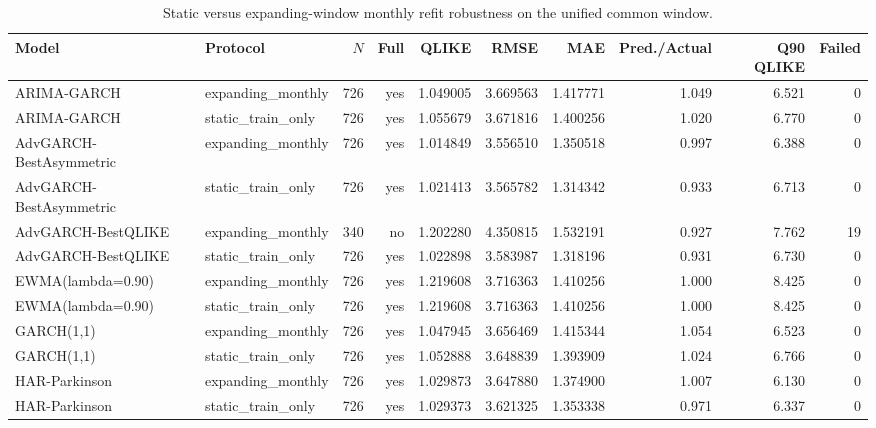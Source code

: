 \begin{table}[!t]
\centering
\caption{Static versus expanding-window monthly refit robustness on the unified common window.}
\label{tab:refit-protocol-results}
\scriptsize
\setlength{\tabcolsep}{4pt}
\begin{tabular}{@{}L{0.18\textwidth}L{0.12\textwidth}rrrrrrrr@{}}
\toprule
Model & Protocol & \(N\) & Full & QLIKE & RMSE & MAE & Pred./Actual & Q90 QLIKE & Failed \\
\midrule
ARIMA-GARCH & expanding\_monthly & 726 & yes & 1.049005 & 3.669563 & 1.417771 & 1.049 & 6.521 & 0 \\
ARIMA-GARCH & static\_train\_only & 726 & yes & 1.055679 & 3.671816 & 1.400256 & 1.020 & 6.770 & 0 \\
AdvGARCH-BestAsymmetric & expanding\_monthly & 726 & yes & 1.014849 & 3.556510 & 1.350518 & 0.997 & 6.388 & 0 \\
AdvGARCH-BestAsymmetric & static\_train\_only & 726 & yes & 1.021413 & 3.565782 & 1.314342 & 0.933 & 6.713 & 0 \\
AdvGARCH-BestQLIKE & expanding\_monthly & 340 & no & 1.202280 & 4.350815 & 1.532191 & 0.927 & 7.762 & 19 \\
AdvGARCH-BestQLIKE & static\_train\_only & 726 & yes & 1.022898 & 3.583987 & 1.318196 & 0.931 & 6.730 & 0 \\
EWMA(lambda=0.90) & expanding\_monthly & 726 & yes & 1.219608 & 3.716363 & 1.410256 & 1.000 & 8.425 & 0 \\
EWMA(lambda=0.90) & static\_train\_only & 726 & yes & 1.219608 & 3.716363 & 1.410256 & 1.000 & 8.425 & 0 \\
GARCH(1,1) & expanding\_monthly & 726 & yes & 1.047945 & 3.656469 & 1.415344 & 1.054 & 6.523 & 0 \\
GARCH(1,1) & static\_train\_only & 726 & yes & 1.052888 & 3.648839 & 1.393909 & 1.024 & 6.766 & 0 \\
HAR-Parkinson & expanding\_monthly & 726 & yes & 1.029873 & 3.647880 & 1.374900 & 1.007 & 6.130 & 0 \\
HAR-Parkinson & static\_train\_only & 726 & yes & 1.029373 & 3.621325 & 1.353338 & 0.971 & 6.337 & 0 \\
\bottomrule
\end{tabular}
\end{table}
